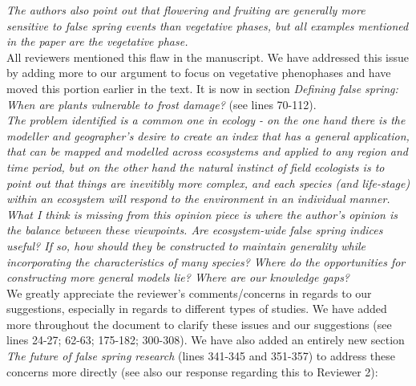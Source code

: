 \documentclass[11pt,a4paper]{article}
\begin{document}
\textit{The authors also point out that flowering and fruiting are generally more sensitive to false spring events than vegetative phases, but all examples mentioned in the paper are the vegetative phase.} \\

All reviewers mentioned this flaw in the manuscript. We have addressed this issue by adding more to our argument to focus on vegetative phenophases and have moved this portion earlier in the text. It is now in section \textit{Defining false spring: When are plants vulnerable to frost damage?} (see lines 70-112). \\

\textit{The problem identified is a common one in ecology - on the one hand there is the modeller and geographer's desire to create an index that has a general application, that can be mapped and modelled across ecosystems and applied to any region and time period, but on the other hand the natural instinct of field ecologists is to point out that things are inevitibly more complex, and each species (and life-stage) within an ecosystem will respond to the environment in an individual manner. What I think is missing from this opinion piece is where the author's opinion is the balance between these viewpoints.  Are ecosystem-wide false spring indices useful?  If so, how should they be constructed to maintain generality while incorporating the characteristics of many species?  Where do the opportunities for constructing more general models lie? Where are our knowledge gaps?} \\

We greatly appreciate the reviewer's comments/concerns in regards to our suggestions, especially in regards to different types of studies. We have added more throughout the document to clarify these issues and our suggestions (see lines 24-27; 62-63; 175-182; 300-308). We have also added an entirely new section \textit{The future of false spring research} (lines 341-345 and 351-357) to address these concerns more directly (see also our response regarding this to Reviewer 2): \\ 
\end{document}
